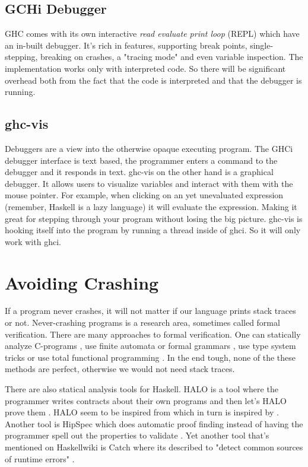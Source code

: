 \subsection{GCHi Debugger}

GHC comes with its own interactive \emph{read evaluate print loop} (REPL)
which have an in-built debugger. It's rich in features, supporting break
points, single-stepping, breaking on crashes, a "tracing mode" and even
variable inspection. The implementation works only with interpreted
code. \cite{ghci_debugger} So there will be significant overhead both
from the fact that the code is interpreted and that the debugger is
running.


\subsection{ghc-vis}

Debuggers are a view into the otherwise opaque executing program. The
GHCi debugger interface is text based, the programmer enters a command
to the debugger and it responds in text.  ghc-vis on the other hand is a
graphical debugger.  It allows users to visualize variables and interact
with them with the mouse pointer. For example, when clicking on an yet
unevaluated expression (remember, Haskell is a lazy language) it will
evaluate the expression.  Making it great for stepping through your
program without losing the big picture.  ghc-vis is hooking itself into
the program by running a thread inside of ghci. So it will only work
with ghci.  \cite{thesisFelsingBA}

\section{Avoiding Crashing} \label{sec:avoiding_crashing}

If a program never crashes,
it will not matter if our language prints stack traces or not. Never-crashing programs is a research area, sometimes called formal
verification. There are many approaches to formal verification. One
can statically analyze C-programs \cite{ckl2004},
use finite automata
or formal grammars \cite{dantam2013motion} \cite{rouhani2013software},
use type system tricks \cite{cheney2003first}
or use total functional programming \cite{Turner:jucs_10_7:total_functional_programming}.
In the end tough, none of the these methods are perfect, otherwise we
would not need stack traces.

There are also statical analysis tools for Haskell. HALO is a tool
where the programmer writes contracts about their own programs and
then let's HALO prove them \cite{vytiniotis2013halo}. HALO seem to
be inspired from \cite{xu2009static} which in turn is inspired by
\cite{xu2006extended}. Another tool is HipSpec which does automatic
proof finding instead of having the programmer spell out the properties
to validate \cite{claessen2013automating}. Yet another tool that's
mentioned on Haskellwiki is Catch where its described to "detect common
sources of runtime errors" \cite{haskellwiki_static_analysis_tools}.

